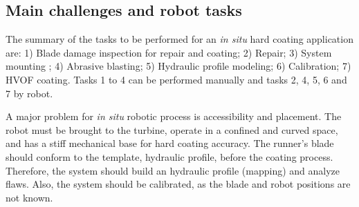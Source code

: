 \subsection{Main challenges and robot tasks}\label{desc_taref}
The summary of the tasks to be performed for an \textit{in situ} hard coating 
application are: 1) Blade damage inspection for repair and coating; 2) Repair; 3)
System mounting ; 4) Abrasive blasting; 5) Hydraulic profile modeling; 6)
Calibration; 7) HVOF coating.
Tasks 1 to 4 can be performed manually and tasks 2, 4, 5, 6 and 7 by robot. 



A major problem for \textit{in situ} robotic process is accessibility and
placement. The robot must be brought to the turbine, operate in a confined
and curved space, and has a stiff mechanical base for hard coating accuracy.
The runner's blade should conform to the template, hydraulic profile, before
the coating process. Therefore, the system should build an hydraulic
profile (mapping) and analyze flaws. Also, the system should be calibrated, as
the blade and robot positions are not known.

